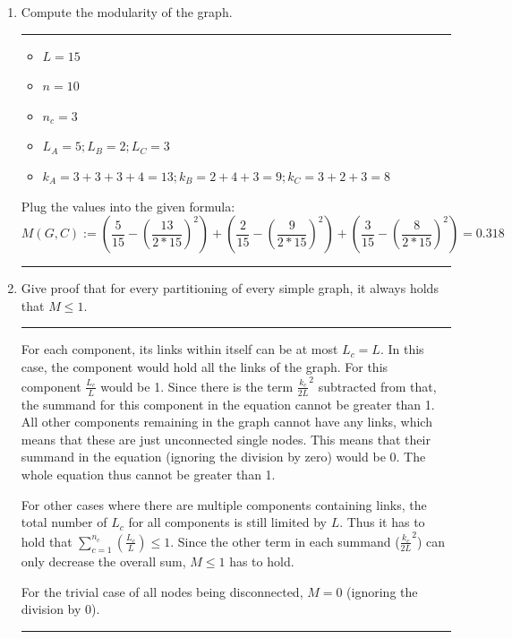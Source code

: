 \begin{enumerate}
	\item Compute the modularity of the graph.
	\hrule \relax
	\begin{itemize}
		\item $L = 15$
		\item $n = 10$
		\item $n_c = 3$
		\item $L_A = 5 ; L_B = 2 ; L_C = 3$
		\item $k_A = 3 + 3 + 3 + 4 = 13 ; k_B = 2 + 4 + 3 = 9 ; k_C = 3 + 2 + 3 = 8$
	\end{itemize}

	Plug the values into the given formula:
	\begin{equation}
		M(G,C) := ( \frac{5}{15} - (\frac{13}{2*15})^2 ) + 
		( \frac{2}{15} - (\frac{9}{2*15})^2 ) + 
		( \frac{3}{15} - (\frac{8}{2*15})^2 ) = 0.318
	\end{equation}
	
	\hrule \relax
	\item Give proof that for every partitioning of every simple graph, it always holds that $M \leq 1$.
	\hrule \relax
	
	For each component, its links within itself can be at most $L_c = L$. In this case, the component would hold all the links of the graph. For this component $\frac{L_c}{L}$ would be 1.  Since there is the term $\frac{k_c}{2L}^2$ subtracted from that, the summand for this component in the equation cannot be greater than 1. All other components remaining in the graph cannot have any links, which means that these are just unconnected single nodes.  This means that their summand in the equation (ignoring the division by zero) would be 0. The whole equation thus cannot be greater than 1.
	
	For other cases where there are multiple components containing links, the total number of $L_c$ for all components is still limited by $L$. Thus it has to hold that $\sum^{n_c}_{c=1}(\frac{L_c}{L}) \leq 1$. Since the other term in each summand ($\frac{k_c}{2L}^2$) can only decrease the overall sum, $M \leq 1$ has to hold.
	
	For the trivial case of all nodes being disconnected, $M = 0$ (ignoring the division by 0).
	
	\hrule \relax	
\end{enumerate}